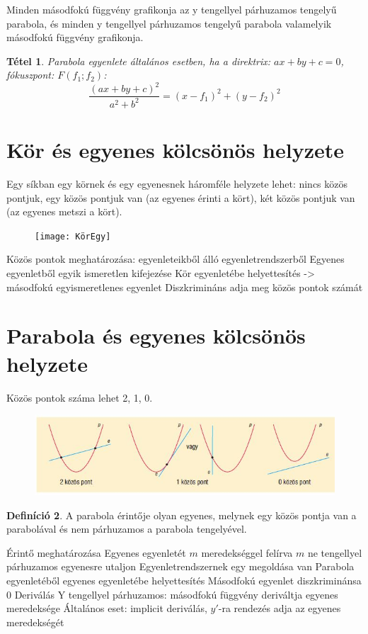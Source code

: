 \documentclass[twoside,12pt]{report}
\newtheorem{theorem}{Tétel}[section]
\theoremstyle{definition}
\newtheorem{definition}[theorem]{Definíció}
\begin{document}
	Minden másodfokú függvény grafikonja az y tengellyel párhuzamos tengelyű parabola, és minden y tengellyel párhuzamos tengelyű parabola valamelyik másodfokú függvény grafikonja.
	\begin{theorem}
		Parabola egyenlete általános esetben, ha a direktrix: $ax+by+c=0$, fókuszpont: $F(f_1;f_2)$:
		\begin{equation*}
		\frac{(ax+by+c)^2}{a^2+b^2}=(x-f_1)^2+(y-f_2)^2
		\end{equation*}
	\end{theorem}
\section{Kör és egyenes kölcsönös helyzete}
	Egy síkban egy körnek és egy egyenesnek háromféle helyzete lehet: nincs közös pontjuk, egy közös pontjuk van (az egyenes érinti a kört), két közös pontjuk van (az egyenes metszi a kört).
	\begin{figure}[H]
		\centering
		\texttt{[image: KörEgy]}
	\end{figure}
	\begin{outline}
		\1 Közös pontok meghatározása: egyenleteikből álló egyenletrendszerből
			\2 Egyenes egyenletből egyik ismeretlen kifejezése
			\2 Kör egyenletébe helyettesítés -> másodfokú egyismeretlenes egyenlet
			\2 Diszkrimináns adja meg közös pontok számát
	\end{outline}
\section{Parabola és egyenes kölcsönös helyzete}
	Közös pontok száma lehet 2, 1, 0.
	\begin{figure}[H]
		\centering
		\includegraphics[width=\linewidth]{ParEgye}
	\end{figure}
	\begin{definition}
		A parabola érintője olyan egyenes, melynek egy közös pontja van a parabolával és
		nem párhuzamos a parabola tengelyével.
	\end{definition}
	\begin{outline}
		\1 Érintő meghatározása
			\2 Egyenes egyenletét $m$ meredekséggel felírva
				\3 $m$ ne tengellyel párhuzamos egyenesre utaljon
			\2 Egyenletrendszernek egy megoldása van
			\2 Parabola egyenletéből egyenes egyenletébe helyettesítés
				\3 Másodfokú egyenlet diszkriminánsa 0
		\1 Deriválás
			\2 Y tengellyel párhuzamos: másodfokú függvény deriváltja egyenes meredeksége
			\2 Általános eset: implicit deriválás, $y'$-ra rendezés adja az egyenes meredekségét
	\end{outline}
\end{document}

